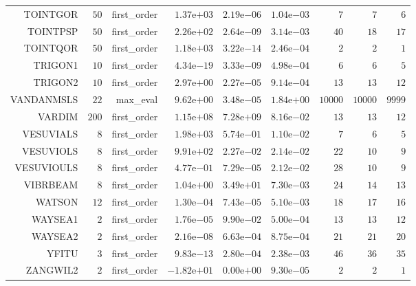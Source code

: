 \begin{longtable}{rrrrrrrrr}
TOINTGOR & \(    50\) & first\_order & \( 1.37\)e\(+03\) & \( 2.19\)e\(-06\) & \( 1.04\)e\(-03\) & \(     7\) & \(     7\) & \(     6\) \\
TOINTPSP & \(    50\) & first\_order & \( 2.26\)e\(+02\) & \( 2.64\)e\(-09\) & \( 3.14\)e\(-03\) & \(    40\) & \(    18\) & \(    17\) \\
TOINTQOR & \(    50\) & first\_order & \( 1.18\)e\(+03\) & \( 3.22\)e\(-14\) & \( 2.46\)e\(-04\) & \(     2\) & \(     2\) & \(     1\) \\
TRIGON1 & \(    10\) & first\_order & \( 4.34\)e\(-19\) & \( 3.33\)e\(-09\) & \( 4.98\)e\(-04\) & \(     6\) & \(     6\) & \(     5\) \\
TRIGON2 & \(    10\) & first\_order & \( 2.97\)e\(+00\) & \( 2.27\)e\(-05\) & \( 9.14\)e\(-04\) & \(    13\) & \(    13\) & \(    12\) \\
VANDANMSLS & \(    22\) & max\_eval & \( 9.62\)e\(+00\) & \( 3.48\)e\(-05\) & \( 1.84\)e\(+00\) & \( 10000\) & \( 10000\) & \(  9999\) \\
VARDIM & \(   200\) & first\_order & \( 1.15\)e\(+08\) & \( 7.28\)e\(+09\) & \( 8.16\)e\(-02\) & \(    13\) & \(    13\) & \(    12\) \\
VESUVIALS & \(     8\) & first\_order & \( 1.98\)e\(+03\) & \( 5.74\)e\(-01\) & \( 1.10\)e\(-02\) & \(     7\) & \(     6\) & \(     5\) \\
VESUVIOLS & \(     8\) & first\_order & \( 9.91\)e\(+02\) & \( 2.27\)e\(-02\) & \( 2.14\)e\(-02\) & \(    22\) & \(    10\) & \(     9\) \\
VESUVIOULS & \(     8\) & first\_order & \( 4.77\)e\(-01\) & \( 7.29\)e\(-05\) & \( 2.12\)e\(-02\) & \(    28\) & \(    10\) & \(     9\) \\
VIBRBEAM & \(     8\) & first\_order & \( 1.04\)e\(+00\) & \( 3.49\)e\(+01\) & \( 7.30\)e\(-03\) & \(    24\) & \(    14\) & \(    13\) \\
WATSON & \(    12\) & first\_order & \( 1.30\)e\(-04\) & \( 7.43\)e\(-05\) & \( 5.10\)e\(-03\) & \(    18\) & \(    17\) & \(    16\) \\
WAYSEA1 & \(     2\) & first\_order & \( 1.76\)e\(-05\) & \( 9.90\)e\(-02\) & \( 5.00\)e\(-04\) & \(    13\) & \(    13\) & \(    12\) \\
WAYSEA2 & \(     2\) & first\_order & \( 2.16\)e\(-08\) & \( 6.63\)e\(-04\) & \( 8.75\)e\(-04\) & \(    21\) & \(    21\) & \(    20\) \\
YFITU & \(     3\) & first\_order & \( 9.83\)e\(-13\) & \( 2.80\)e\(-04\) & \( 2.38\)e\(-03\) & \(    46\) & \(    36\) & \(    35\) \\
ZANGWIL2 & \(     2\) & first\_order & \(-1.82\)e\(+01\) & \( 0.00\)e\(+00\) & \( 9.30\)e\(-05\) & \(     2\) & \(     2\) & \(     1\) \\\hline
\end{longtable}
